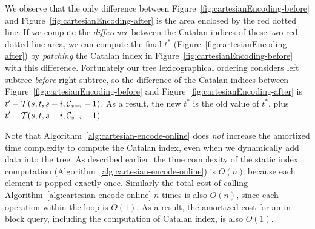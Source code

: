 We observe that the only difference between
Figure~\ref{fig:cartesianEncoding-before} and
Figure~\ref{fig:cartesianEncoding-after} is the area enclosed by the red
dotted line.  If we compute the {\em difference} between the Catalan
indices of these two red dotted line area, we can compute the final
$t^*$ (Figure~\ref{fig:cartesianEncoding-after}) by {\em patching} the
Catalan index in Figure~\ref{fig:cartesianEncoding-before} with this
difference. Fortunately our tree lexicographical ordering considers left
subtree {\em before} right subtree, so the difference of the Catalan
indices between Figure~\ref{fig:cartesianEncoding-before} and
Figure~\ref{fig:cartesianEncoding-after} is $t' - {\cal T}(s, t, s - i,
{\cal C}_{s-i} - 1)$.  As a result, the new $t^*$ is the old value of
$t^*$, plus $t' - {\cal T}(s, t, s - i, {\cal C}_{s-i} - 1)$.

Note that Algorithm~\ref{alg:cartesian-encode-online} does {\em not}
increase the amortized time complexity to compute the Catalan index,
even when we dynamically add data into the tree.  As described earlier,
the time complexity of the static index computation
(Algorithm~\ref{alg:cartesian-encode-online}) is $O(n)$ because each
element is popped exactly once.  Similarly the total cost of calling
Algorithm~\ref{alg:cartesian-encode-online} $n$ times is also $O(n)$,
since each operation within the loop is $O(1)$.  As a result, the
amortized cost for an in-block query, including the computation of
Catalan index, is also $O(1)$.
